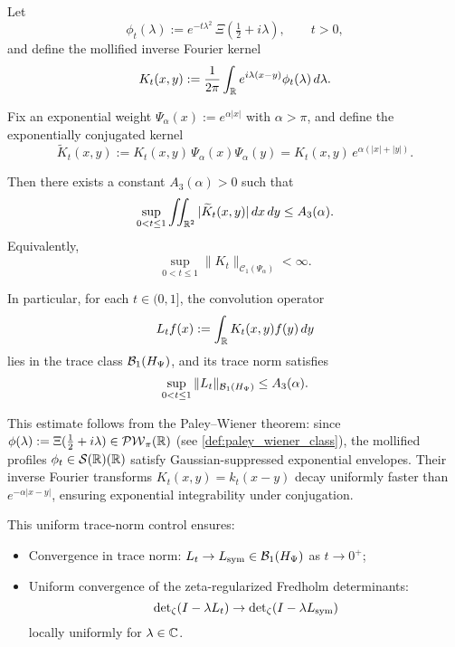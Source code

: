 \begin{lemma}
\label{lem:uniform_L1_conjugated_kernel}
Let
\[
\phi_t(\lambda) := e^{-t\lambda^2} \, \Xi\left( \tfrac{1}{2} + i\lambda \right), \qquad t > 0,
\]
and define the mollified inverse Fourier kernel
\[
K_t(x,y) := \frac{1}{2\pi} \int_{\mathbb{R}} e^{i\lambda(x - y)} \phi_t(\lambda) \, d\lambda.
\]

Fix an exponential weight \( \Psi_\alpha(x) := e^{\alpha |x|} \) with \( \alpha > \pi \), and define the exponentially conjugated kernel
\[
\widetilde{K}_t(x,y) := K_t(x,y)\, \Psi_\alpha(x)\Psi_\alpha(y) = K_t(x,y)\, e^{\alpha(|x| + |y|)}.
\]

Then there exists a constant \( A_3(\alpha) > 0 \) such that
\[
\sup_{0 < t \le 1} \iint_{\mathbb{R}^2} |\widetilde{K}_t(x,y)| \, dx\,dy \le A_3(\alpha).
\]
Equivalently,
\[
\sup_{0 < t \le 1} \|K_t\|_{\mathcal{C}_1(\Psi_\alpha)} < \infty.
\]

\medskip
\noindent
In particular, for each \( t \in (0,1] \), the convolution operator
\[
L_t f(x) := \int_{\mathbb{R}} K_t(x,y) f(y)\, dy
\]
lies in the trace class \( \mathcal{B}_1(H_{\Psi}) \), and its trace norm satisfies
\[
\sup_{0 < t \le 1} \|L_t\|_{\mathcal{B}_1(H_{\Psi})} \le A_3(\alpha).
\]

\medskip
\noindent
This estimate follows from the Paley--Wiener theorem: since \( \phi(\lambda) := \Xi(\tfrac{1}{2} + i\lambda) \in \mathcal{PW}_{\pi}(\mathbb{R}) \) (see \cref{def:paley_wiener_class}), the mollified profiles \( \phi_t \in \mathcal{S}(\mathbb{R})(\mathbb{R}) \) satisfy Gaussian-suppressed exponential envelopes. Their inverse Fourier transforms \( K_t(x,y) = k_t(x - y) \) decay uniformly faster than \( e^{-\alpha |x - y|} \), ensuring exponential integrability under conjugation.

\medskip
\noindent
This uniform trace-norm control ensures:
\begin{itemize}
    \item Convergence in trace norm: \( L_t \to L_{\mathrm{sym}} \in \mathcal{B}_1(H_{\Psi}) \) as \( t \to 0^+ \);
    \item Uniform convergence of the zeta-regularized Fredholm determinants:
    \[
    \det\nolimits_\zeta(I - \lambda L_t) \to \det\nolimits_\zeta(I - \lambda L_{\mathrm{sym}})
    \]
    locally uniformly for \( \lambda \in \mathbb{C} \).
\end{itemize}
\end{lemma}
